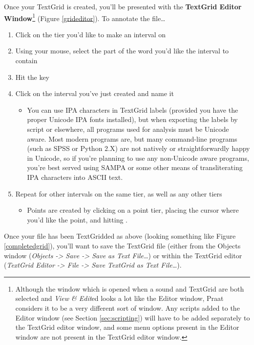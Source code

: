 \documentclass[11pt]{article}
\def\tightlist{}
\begin{document}
Once your TextGrid is created, you'll be presented with the
\textbf{TextGrid Editor
Window}\footnote{Although the window which is opened when a sound and TextGrid are both selected and \textit{View \& Edit}ed looks a lot like the Editor window, Praat considers it to be a very different sort of window.  Any scripts added to the Editor window (see Section \ref{sec:scripting}) will have to be added separately to the TextGrid editor window, and some menu options present in the Editor window are not present in the TextGrid editor window.}
(Figure \ref{grideditor}). To annotate the file\ldots{}

\begin{enumerate}
\def\labelenumi{\arabic{enumi}.}
\setcounter{enumi}{4}
\tightlist
\item
  Click on the tier you'd like to make an interval on
\item
  Using your mouse, select the part of the word you'd like the interval
  to contain
\item
  Hit the key
\item
  Click on the interval you've just created and name it

  \begin{itemize}
  \tightlist
  \item
    You can use IPA characters in TextGrid labels (provided you have the
    proper Unicode IPA fonts installed), but when exporting the labels
    by script or elsewhere, all programs used for analysis must be
    Unicode aware. Most modern programs are, but many command-line
    programs (such as SPSS or Python 2.X) are not natively or
    straightforwardly happy in Unicode, so if you're planning to use any
    non-Unicode aware programs, you're best served using SAMPA or some
    other means of transliterating IPA characters into ASCII text.
  \end{itemize}
\item
  Repeat for other intervals on the same tier, as well as any other
  tiers

  \begin{itemize}
  \tightlist
  \item
    Points are created by clicking on a point tier, placing the cursor
    where you'd like the point, and hitting .
  \end{itemize}
\end{enumerate}

Once your file has been TextGridded as above (looking something like
Figure \ref{completedgrid}), you'll want to save the TextGrid file
(either from the Objects window (\emph{Objects -\textgreater{} Save
-\textgreater{} Save as Text File\ldots{}}) or within the TextGrid
editor (\emph{TextGrid Editor -\textgreater{} File -\textgreater{} Save
TextGrid as Text File\ldots{}}).
\end{document}
